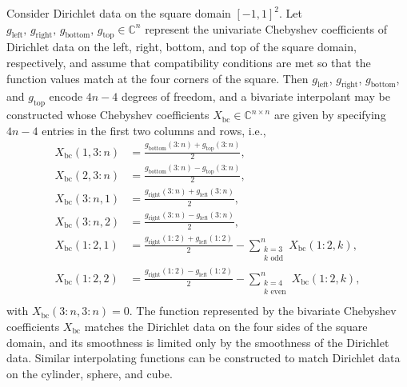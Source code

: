 Consider Dirichlet data on the square domain $[-1,1]^2$. Let $g_\text{left}, \,g_\text{right}, \,g_\text{bottom}, \,g_\text{top} \in \mathbb{C}^n$ represent the univariate Chebyshev coefficients of Dirichlet data on the left, right, bottom, and top of the square domain, respectively, and assume that compatibility conditions are met so that the function values match at the four corners of the square. Then $g_\text{left}$, $g_\text{right}$, $g_\text{bottom}$, and $g_\text{top}$ encode $4n-4$ degrees of freedom, and a bivariate interpolant may be constructed whose Chebyshev coefficients $X_\text{bc} \in \mathbb{C}^{n \times n}$ are given by specifying $4n-4$ entries in the first two columns and rows, i.e.,
\[
\begin{aligned}
X_\text{bc}(1,3\!:\!n) &= \frac{g_\text{bottom}(3\!:\!n) + g_\text{top}(3\!:\!n)}{2}, \\
X_\text{bc}(2,3\!:\!n) &= \frac{g_\text{bottom}(3\!:\!n) - g_\text{top}(3\!:\!n)}{2}, \\
X_\text{bc}(3\!:\!n,1) &= \frac{g_\text{right}(3\!:\!n) + g_\text{left}(3\!:\!n)}{2}, \\ %
X_\text{bc}(3\!:\!n,2) &= \frac{g_\text{right}(3\!:\!n) - g_\text{left}(3\!:\!n)}{2}, \\%
X_\text{bc}(1\!:\!2,1) &= \frac{g_\text{right}(1\!:\!2) + g_\text{left}(1\!:\!2)}{2} - \sum_{\substack{k=3 \\ k \text{ odd}}}^n X_\text{bc}(1\!:\!2, k), \\
X_\text{bc}(1\!:\!2,2) &= \frac{g_\text{right}(1\!:\!2)  - g_\text{left}(1\!:\!2)}{2} - \sum_{\substack{k=4 \\ k \text{ even}}}^n X_\text{bc}(1\!:\!2, k), \\
\end{aligned}
\]
with $X_\text{bc}(3\!\!:\!\!n, 3\!\!:\!\!n) = 0$. The function represented by the bivariate Chebyshev coefficients $X_\text{bc}$ matches the Dirichlet data on the four sides of the square domain, and its smoothness is limited only by the smoothness of the Dirichlet data. Similar interpolating functions can be constructed to match Dirichlet data on the cylinder, sphere, and cube.
